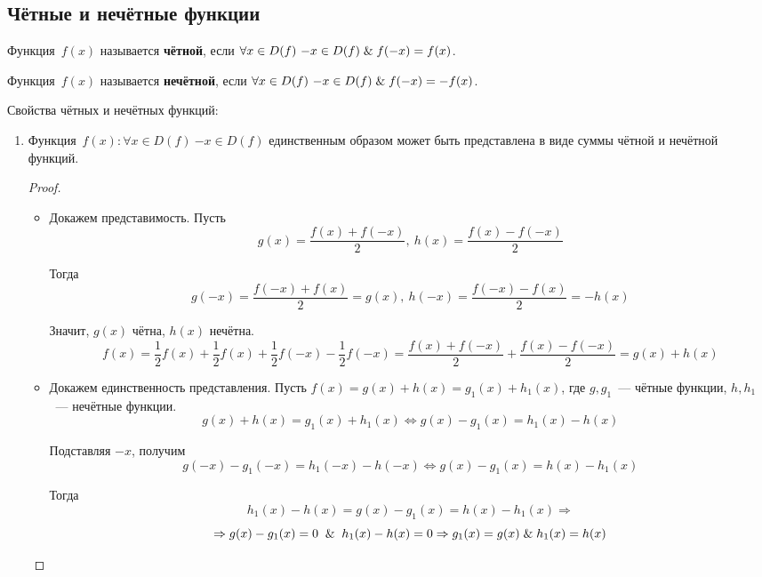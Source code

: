 \subsection{Чётные и нечётные функции}
 Функция~$f(x)$ называется \textbf{чётной}, если $\forall x \in D(f) \ {-x} \in D(f) \mathrel{\&} f(-x) = f(x)$.

 Функция~$f(x)$ называется \textbf{нечётной}, если $\forall x \in D(f) \ {-x} \in D(f) \mathrel{\&} f(-x) = -f(x)$.

Свойства чётных и нечётных функций:
\begin{enumerate}
	\item Функция~$f(x) \colon \forall x \in D(f) \ {-x} \in D(f)$ единственным образом может быть представлена в виде суммы чётной и нечётной функций.
	\begin{proof}
	\begin{itemize}
		\item Докажем представимость.
		Пусть
		\begin{equation*}
		g(x) = \frac{f(x) + f(-x)}2, \ h(x) = \frac{f(x) - f(-x)}2
		\end{equation*}
		
		Тогда
		\begin{equation*}
		g(-x) = \frac{f(-x) + f(x)}2 = g(x), \ h(-x) = \frac{f(-x) - f(x)}2 = -h(x)
		\end{equation*}
		
		Значит, $g(x)$ чётна, $h(x)$ нечётна.
		\begin{equation*}
		f(x) = \frac12 f(x) + \frac12 f(x) + \frac12 f(-x) - \frac12 f(-x) =
		\frac{f(x) + f(-x)}2 + \frac{f(x) - f(-x)}2 =
		g(x) + h(x)
		\end{equation*}
		
		\item Докажем единственность представления.
		Пусть $f(x) = g(x) + h(x) = g_1(x) + h_1(x)$, где $g, g_1$~--- чётные функции, $h, h_1$~--- нечётные функции.
		\begin{equation*}
		g(x) + h(x) = g_1(x) + h_1(x) \Leftrightarrow
		g(x) - g_1(x) = h_1(x) - h(x)
		\end{equation*}
		
		Подставляя $-x$, получим
		\begin{equation*}
		g(-x) - g_1(-x) = h_1(-x) - h(-x) \Leftrightarrow
		g(x) - g_1(x) = h(x) - h_1(x)
		\end{equation*}
		
		Тогда
		\begin{equation*}
		h_1(x) - h(x) = g(x) - g_1(x) = h(x) - h_1(x) \Rightarrow
		\end{equation*}
		\begin{equation*}
		\Rightarrow g(x) - g_1(x) = 0 \And h_1(x) - h(x) = 0 \Rightarrow
		g_1(x) = g(x) \lAnd h_1(x) = h(x)
		\end{equation*}
	\end{itemize}
	\end{proof}
	

\end{enumerate}
